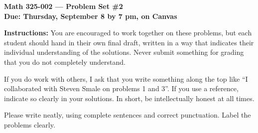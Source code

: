 \documentclass{amsart}
\begin{document}
\begin{center}
{\large\bfseries
Math 325-002 --- Problem Set \#2 \\
Due: Thursday, September 8 by 7 pm, on Canvas}
\end{center}





{\bf Instructions:} You are encouraged to work together on these
problems, but each student should hand in their own final draft,
written in a way that indicates their individual understanding of
the solutions. Never submit something for grading
that you do not completely understand. 

If you do work with others, I ask that you write something along the
top like ``I collaborated with Steven Smale on problems 1 and 3''.
If you use a reference, indicate so clearly in your solutions. 
In short, be intellectually
honest at all times.

Please write neatly, using complete sentences and correct
punctuation. Label the problems clearly. 
\end{document}
